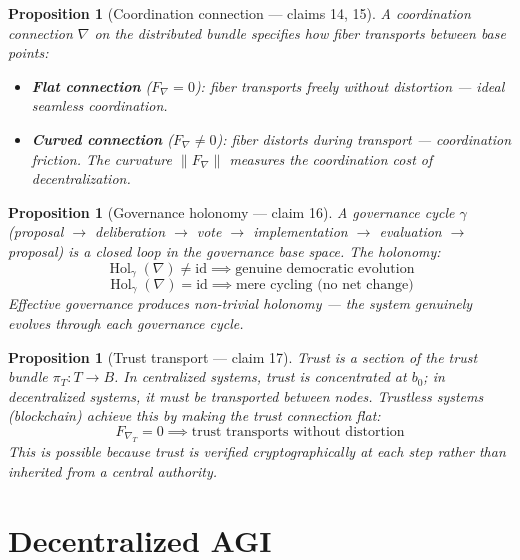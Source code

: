 \documentclass[11pt,a4paper]{article}
\newtheorem{proposition}[definition]{Proposition}
\begin{document}
\begin{proposition}[Coordination connection --- claims 14, 15]
\label{prop:connection}
A \emph{coordination connection} $\nabla$ on the distributed bundle
specifies how fiber transports between base points:
\begin{itemize}
  \item \textbf{Flat connection} ($F_\nabla = 0$): fiber transports freely
    without distortion --- ideal seamless coordination.
  \item \textbf{Curved connection} ($F_\nabla \neq 0$): fiber distorts
    during transport --- coordination friction. The curvature $\|F_\nabla\|$
    measures the coordination cost of decentralization.
\end{itemize}
\end{proposition}

\begin{proposition}[Governance holonomy --- claim 16]
\label{prop:holonomy}
A governance cycle $\gamma$ (proposal $\to$ deliberation $\to$ vote $\to$
implementation $\to$ evaluation $\to$ proposal) is a closed loop in the
governance base space. The holonomy:
\[
  \operatorname{Hol}_\gamma(\nabla) \neq \mathrm{id}
  \implies \text{genuine democratic evolution}
\]
\[
  \operatorname{Hol}_\gamma(\nabla) = \mathrm{id}
  \implies \text{mere cycling (no net change)}
\]
Effective governance produces non-trivial holonomy --- the system genuinely
evolves through each governance cycle.
\end{proposition}

\begin{proposition}[Trust transport --- claim 17]
\label{prop:trust}
Trust is a section of the trust bundle $\pi_T : T \to B$. In centralized
systems, trust is concentrated at $b_0$; in decentralized systems, it must
be transported between nodes. Trustless systems (blockchain) achieve this
by making the trust connection flat:
\[
  F_{\nabla_T} = 0 \implies \text{trust transports without distortion}
\]
This is possible because trust is verified cryptographically at each step
rather than inherited from a central authority.
\end{proposition}

\section{Decentralized AGI}
\end{document}
